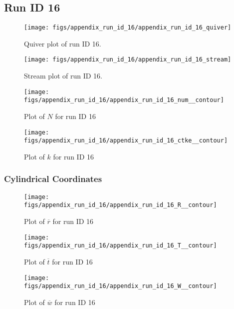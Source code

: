 \subsection{Run ID 16}
\begin{figure}[H]
\centering
\texttt{[image: figs/appendix\_run\_id\_16/appendix\_run\_id\_16\_quiver]}
\caption{Quiver plot of run ID 16.}
\label{fig:appendix_run_id_16_quiver}
\end{figure}


\begin{figure}[H]
\centering
\texttt{[image: figs/appendix\_run\_id\_16/appendix\_run\_id\_16\_stream]}
\caption{Stream plot of run ID 16.}
\label{fig:appendix_run_id_16_stream}
\end{figure}


\begin{figure}[H]
\centering
\texttt{[image: figs/appendix\_run\_id\_16/appendix\_run\_id\_16\_num\_\_contour]}
\caption{Plot of $N$ for run ID 16}
\label{fig:appendix_run_id_16_num__contour}
\end{figure}


\begin{figure}[H]
\centering
\texttt{[image: figs/appendix\_run\_id\_16/appendix\_run\_id\_16\_ctke\_\_contour]}
\caption{Plot of $k$ for run ID 16}
\label{fig:appendix_run_id_16_ctke__contour}
\end{figure}


\subsubsection{Cylindrical Coordinates}
\begin{figure}[H]
\centering
\texttt{[image: figs/appendix\_run\_id\_16/appendix\_run\_id\_16\_R\_\_contour]}
\caption{Plot of $\overline{r}$ for run ID 16}
\label{fig:appendix_run_id_16_R__contour}
\end{figure}


\begin{figure}[H]
\centering
\texttt{[image: figs/appendix\_run\_id\_16/appendix\_run\_id\_16\_T\_\_contour]}
\caption{Plot of $\overline{t}$ for run ID 16}
\label{fig:appendix_run_id_16_T__contour}
\end{figure}


\begin{figure}[H]
\centering
\texttt{[image: figs/appendix\_run\_id\_16/appendix\_run\_id\_16\_W\_\_contour]}
\caption{Plot of $\overline{w}$ for run ID 16}
\label{fig:appendix_run_id_16_W__contour}
\end{figure}



